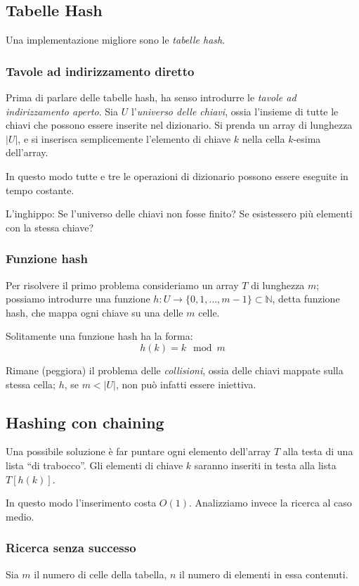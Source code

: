 \documentclass[a4paper,10pt]{article}
\theoremstyle{definition}
\newcommand{\naturals}{\mathbb{N}}
\begin{document}
\subsection{Tabelle Hash}
Una implementazione migliore sono le \emph{tabelle hash}.

\subsubsection{Tavole ad indirizzamento diretto}
Prima di parlare delle tabelle hash, ha senso introdurre le \emph{tavole ad indirizzamento aperto}. Sia $U$ l'\emph{universo delle chiavi}, ossia l'insieme di tutte le chiavi che possono essere inserite nel dizionario. Si prenda un array di lunghezza $|U|$, e si inserisca semplicemente l'elemento di chiave $k$ nella cella $k$-esima dell'array. \smallskip

In questo modo tutte e tre le operazioni di dizionario possono essere eseguite in tempo costante. \bigskip

L'inghippo: Se l'universo delle chiavi non fosse finito? Se esistessero più elementi con la stessa chiave?

\subsubsection{Funzione hash}
Per risolvere il primo problema consideriamo un array $T$ di lunghezza $m$; possiamo introdurre una funzione $h : U \to \{0,1, \hdots, m-1\} \subset \naturals$, detta funzione hash, che mappa ogni chiave su una delle $m$ celle.

Solitamente una funzione hash ha la forma: \[h(k) = k\mod m\]

Rimane (peggiora) il problema delle \emph{collisioni}, ossia delle chiavi mappate sulla stessa cella; $h$, se $m<|U|$, non può infatti essere iniettiva.
\newpage
\subsection{Hashing con chaining}
Una possibile soluzione è far puntare ogni elemento dell'array $T$ alla testa di una lista ``di trabocco''. Gli elementi di chiave $k$ saranno inseriti in testa alla lista $T[h(k)]$.\smallskip


In questo modo l'inserimento costa $O(1)$. Analizziamo invece la ricerca al caso medio.\bigskip

\subsubsection{Ricerca senza successo}
Sia $m$ il numero di celle della tabella, $n$ il numero di elementi in essa contenuti.\bigskip
\end{document}
